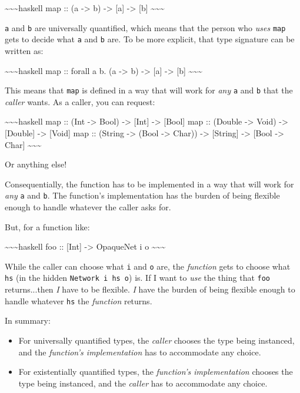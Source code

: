 \documentclass[]{article}
\begin{document}
\textasciitilde{}\textasciitilde{}\textasciitilde{}haskell map :: (a
-\textgreater{} b) -\textgreater{} {[}a{]} -\textgreater{} {[}b{]}
\textasciitilde{}\textasciitilde{}\textasciitilde{}

\texttt{a} and \texttt{b} are universally quantified, which means that the
person who \emph{uses} \texttt{map} gets to decide what \texttt{a} and
\texttt{b} are. To be more explicit, that type signature can be written as:

\textasciitilde{}\textasciitilde{}\textasciitilde{}haskell map :: forall a b. (a
-\textgreater{} b) -\textgreater{} {[}a{]} -\textgreater{} {[}b{]}
\textasciitilde{}\textasciitilde{}\textasciitilde{}

This means that \texttt{map} is defined in a way that will work for \emph{any}
\texttt{a} and \texttt{b} that the \emph{caller} wants. As a caller, you can
request:

\textasciitilde{}\textasciitilde{}\textasciitilde{}haskell map :: (Int
-\textgreater{} Bool) -\textgreater{} {[}Int{]} -\textgreater{} {[}Bool{]} map
:: (Double -\textgreater{} Void) -\textgreater{} {[}Double{]} -\textgreater{}
{[}Void{]} map :: (String -\textgreater{} (Bool -\textgreater{} Char))
-\textgreater{} {[}String{]} -\textgreater{} {[}Bool -\textgreater{} Char{]}
\textasciitilde{}\textasciitilde{}\textasciitilde{}

Or anything else!

Consequentially, the function has to be implemented in a way that will work for
\emph{any} \texttt{a} and \texttt{b}. The function's implementation has the
burden of being flexible enough to handle whatever the caller asks for.

But, for a function like:

\textasciitilde{}\textasciitilde{}\textasciitilde{}haskell foo :: {[}Int{]}
-\textgreater{} OpaqueNet i o
\textasciitilde{}\textasciitilde{}\textasciitilde{}

While the caller can choose what \texttt{i} and \texttt{o} are, the
\emph{function} gets to choose what \texttt{hs} (in the hidden
\texttt{Network\ i\ hs\ o}) is. If I want to \emph{use} the thing that
\texttt{foo} returns...then \emph{I} have to be flexible. \emph{I} have the
burden of being flexible enough to handle whatever \texttt{hs} the
\emph{function} returns.

In summary:

\begin{itemize}
\item
  For universally quantified types, the \emph{caller} chooses the type being
  instanced, and the \emph{function's implementation} has to accommodate any
  choice.
\item
  For existentially quantified types, the \emph{function's implementation}
  chooses the type being instanced, and the \emph{caller} has to accommodate any
  choice.
\end{itemize}
\end{document}
